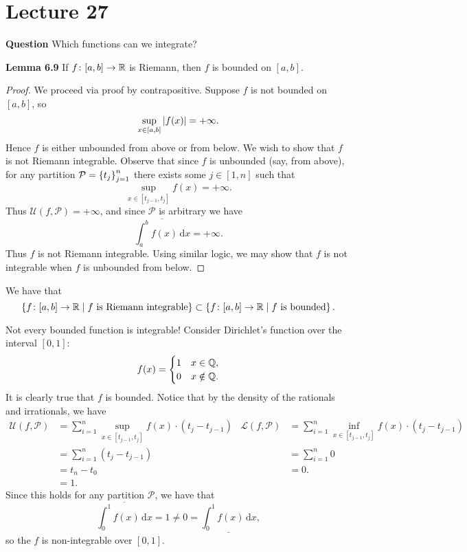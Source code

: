 \documentclass[class=article, crop=false]{standalone}
\begin{document}
  \section{Lecture 27}
  \textbf{Question} Which functions can we integrate? \par
  \textbf{Lemma 6.9} If $f\colon [a, b]\to \mathbb{R}$ is Riemann, then $f$ is bounded on $[a, b]$.
  \begin{proof}
    We proceed via proof by contrapositive. Suppose $f$ is not bounded on $[a, b]$, so
    \[
      \sup_{x\in [a, b]}\left\lvert f(x) \right\rvert = +\infty.
    \]
    Hence $f$ is either unbounded from above or from below. We wish to show that $f$ is not Riemann integrable. Observe that since $f$ is unbounded (say, from above), for any partition $\mathcal{P} = \left\{t_j\right\}_{j = 1}^n$ there exists some $j\in [1, n]$ such that
    \[
      \sup_{x\in [t_{j - 1}, t_j]}f(x) = +\infty.
    \]
    Thus $\mathcal{U}(f, \mathcal{P}) = +\infty$, and since $\mathcal{P}$ is arbitrary we have
    \[
      \overline{\int_{a}^{b}f(x) \,\mathrm dx} = +\infty.
    \]
    Thus $f$ is not Riemann integrable. Using similar logic, we may show that $f$ is not integrable when $f$ is unbounded from below.
  \end{proof}
  \begin{note}{}
    We have that
    \[
      \left\{f\colon [a, b]\to \mathbb{R}\mid f\text{ is Riemann integrable}\right\}\subset \left\{f\colon [a, b]\to \mathbb{R}\mid f\text{ is bounded}\right\}.
    \]
  \end{note}
  \begin{note}{}
    Not every bounded function is integrable! Consider Dirichlet's function over the interval $[0, 1]$:
    \[
      f(x) = \begin{cases}1 & x\in \mathbb{Q}, \\ 0 & x\notin \mathbb{Q}.\end{cases}
    \]
    It is clearly true that $f$ is bounded. Notice that by the density of the rationals and irrationals, we have
    \begin{align*}
      \mathcal{U}(f, \mathcal{P}) &= \sum_{i=1}^{n}\sup_{x\in [t_{j - 1}, t_j]}f(x)\cdot (t_j - t_{j - 1}) & \mathcal{L}(f, \mathcal{P}) &= \sum_{i=1}^{n}\inf_{x\in [t_{j - 1}, t_j]}f(x)\cdot (t_j - t_{j - 1}) \\
                                  &= \sum_{i=1}^{n} (t_j - t_{j - 1}) & &= \sum_{i=1}^{n} 0 \\
                                  &= t_n - t_0 & &= 0. \\
                                  &= 1.
    \end{align*}
    Since this holds for any partition $\mathcal{P}$, we have that
    \[
      \overline{\int_{0}^{1}f(x) \,\mathrm dx} = 1\neq 0 = \underline{\int_{0}^{1}f(x) \,\mathrm dx},
    \]
    so the $f$ is non-integrable over $[0, 1]$.
  \end{note}
\end{document}
